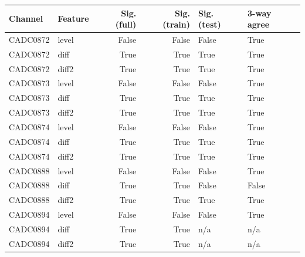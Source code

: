 \begin{tabular}{llrrll}
\toprule
Channel & Feature & Sig. (full) & Sig. (train) & Sig. (test) & 3-way agree \\
\midrule
CADC0872 & level & False & False & False & True \\
CADC0872 & diff & True & True & True & True \\
CADC0872 & diff2 & True & True & True & True \\
CADC0873 & level & False & False & False & True \\
CADC0873 & diff & True & True & True & True \\
CADC0873 & diff2 & True & True & True & True \\
CADC0874 & level & False & False & False & True \\
CADC0874 & diff & True & True & True & True \\
CADC0874 & diff2 & True & True & True & True \\
CADC0888 & level & False & False & False & True \\
CADC0888 & diff & True & True & False & False \\
CADC0888 & diff2 & True & True & True & True \\
CADC0894 & level & False & False & False & True \\
CADC0894 & diff & True & True & n/a & n/a \\
CADC0894 & diff2 & True & True & n/a & n/a \\
\bottomrule
\end{tabular}
